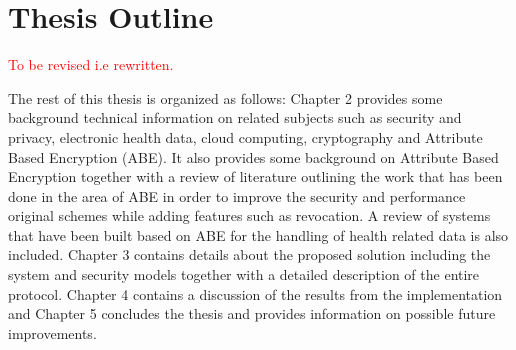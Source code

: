 \section{Thesis Outline}

\textcolor{red}{To be revised i.e rewritten.}

The rest of this thesis is organized as follows: Chapter 2 provides some background technical information on related subjects such as security and privacy, electronic health data, cloud computing, cryptography and Attribute Based Encryption (ABE). It also provides some background on Attribute Based Encryption together with a review of literature outlining the work that has been done in the area of ABE in order to improve the security and performance original schemes while adding features such as revocation. A review of systems that have been built based on ABE for the handling of health related data is also included. Chapter 3 contains details about the proposed solution including the system and security models together with a detailed description of the entire protocol. Chapter 4 contains a discussion of the results from the implementation and Chapter 5 concludes the thesis and provides information on possible future improvements.